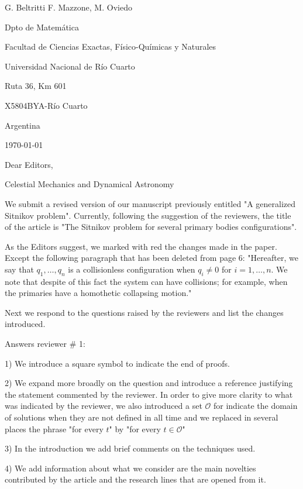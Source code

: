 \documentclass{article}
\begin{document}
\begin{flushright}
G. Beltritti
F. Mazzone,
M. Oviedo


Dpto de Matem\'atica

Facultad de Ciencias Exactas, F\'isico-Qu\'imicas y Naturales

Universidad Nacional de R\'io Cuarto

Ruta 36, Km 601

X5804BYA-R\'io Cuarto

Argentina
\end{flushright}

\today
\vspace{1cm}

Dear Editors,

Celestial Mechanics and Dynamical Astronomy

\vspace{.5cm}

We  submit a revised version of our manuscript previously entitled "A generalized Sitnikov problem". Currently, following the suggestion of the reviewers, the title of the article is  "The Sitnikov problem for several primary bodies configurations".

As the Editors suggest, we marked with red the changes made in the paper. Except the following paragraph that has been deleted from page 6: "Hereafter,  we say that   $q_1,\ldots,q_n$ is a collisionless configuration  when $q_i\neq 0$ for $i=1,\ldots,n$. We note that despite of this fact the system can have collisions; for example,  when the primaries have a homothetic collapsing motion."



Next we respond to the questions raised by the  reviewers and list the changes introduced.

Answers  reviewer # 1:

1) We introduce a square symbol to indicate the end of proofs.

2) We expand more broadly on the question and introduce a reference justifying the statement commented by the reviewer. In order to give more clarity to what was indicated by the reviewer, we also introduced a set $ \mathcal {O} $  for indicate the domain of solutions when they are not defined in all time  and we replaced in several places the phrase "for every $ t $" by "for every $ t \in \mathcal {O} $"

3) In the introduction we add brief comments on the techniques used.

4) We add information about what we consider are the main novelties contributed by the article and the research lines that are opened from it.
\end{document}
